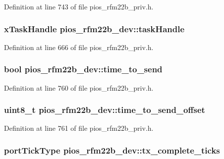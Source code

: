 \-Definition at line 743 of file pios\-\_\-rfm22b\-\_\-priv.\-h.

\hypertarget{structpios__rfm22b__dev_a28c619aaf7379eacea11f08847223cc2}{
\subsubsection[{task\-Handle}]{\setlength{\rightskip}{0pt plus 5cm}x\-Task\-Handle {\bf pios\-\_\-rfm22b\-\_\-dev\-::task\-Handle}}}\label{structpios__rfm22b__dev_a28c619aaf7379eacea11f08847223cc2}


\-Definition at line 666 of file pios\-\_\-rfm22b\-\_\-priv.\-h.

\hypertarget{structpios__rfm22b__dev_a2ab6b40e08577ff473d6a462f6e9ba47}{
\subsubsection[{time\-\_\-to\-\_\-send}]{\setlength{\rightskip}{0pt plus 5cm}bool {\bf pios\-\_\-rfm22b\-\_\-dev\-::time\-\_\-to\-\_\-send}}}\label{structpios__rfm22b__dev_a2ab6b40e08577ff473d6a462f6e9ba47}


\-Definition at line 760 of file pios\-\_\-rfm22b\-\_\-priv.\-h.

\hypertarget{structpios__rfm22b__dev_ad552e65c59e3873f29312042109562cd}{
\subsubsection[{time\-\_\-to\-\_\-send\-\_\-offset}]{\setlength{\rightskip}{0pt plus 5cm}uint8\-\_\-t {\bf pios\-\_\-rfm22b\-\_\-dev\-::time\-\_\-to\-\_\-send\-\_\-offset}}}\label{structpios__rfm22b__dev_ad552e65c59e3873f29312042109562cd}


\-Definition at line 761 of file pios\-\_\-rfm22b\-\_\-priv.\-h.

\hypertarget{structpios__rfm22b__dev_af71e33856164ba7654a523173441ecb3}{
\subsubsection[{tx\-\_\-complete\-\_\-ticks}]{\setlength{\rightskip}{0pt plus 5cm}port\-Tick\-Type {\bf pios\-\_\-rfm22b\-\_\-dev\-::tx\-\_\-complete\-\_\-ticks}}}\label{structpios__rfm22b__dev_af71e33856164ba7654a523173441ecb3}


